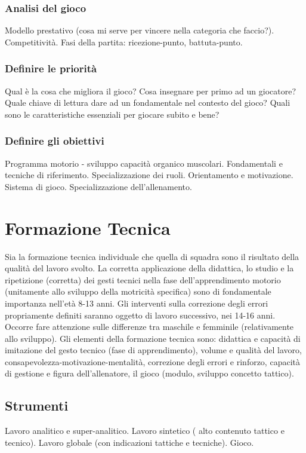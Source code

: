 \subsubsection{Analisi del gioco}
Modello prestativo (cosa mi serve per vincere nella categoria che faccio?).
Competitività.
Fasi della partita: ricezione-punto, battuta-punto.

\subsubsection{Definire le priorità}
Qual è la cosa che migliora il gioco? Cosa insegnare per primo ad un giocatore? Quale chiave di lettura dare ad un fondamentale nel contesto del gioco? Quali sono le caratteristiche essenziali per giocare subito e bene?

\subsubsection{Definire gli obiettivi}
Programma motorio - sviluppo capacità organico muscolari.
Fondamentali e tecniche di riferimento.
Specializzazione dei ruoli.
Orientamento e motivazione.
Sistema di gioco.
Specializzazione dell'allenamento.

\section{Formazione Tecnica}
Sia la formazione tecnica individuale che quella di squadra sono il risultato della qualità del lavoro svolto. La corretta applicazione della didattica, lo studio e la ripetizione (corretta) dei gesti tecnici nella fase dell'apprendimento motorio (unitamente allo sviluppo della motricità specifica) sono di fondamentale importanza nell'età 8-13 anni.
Gli interventi sulla correzione degli errori propriamente definiti saranno oggetto di lavoro successivo, nei 14-16 anni.
Occorre fare attenzione sulle differenze tra maschile e femminile (relativamente allo sviluppo).
Gli elementi della formazione tecnica sono: didattica e capacità di imitazione del gesto tecnico (fase di apprendimento), volume e qualità del lavoro,  consapevolezza-motivazione-mentalità, correzione degli errori e rinforzo, capacità di gestione e figura dell'allenatore, il gioco (modulo, sviluppo concetto tattico).


\subsection{Strumenti}
Lavoro analitico e super-analitico.
Lavoro sintetico ( alto contenuto tattico e tecnico).
Lavoro globale (con indicazioni tattiche e tecniche).
Gioco.

